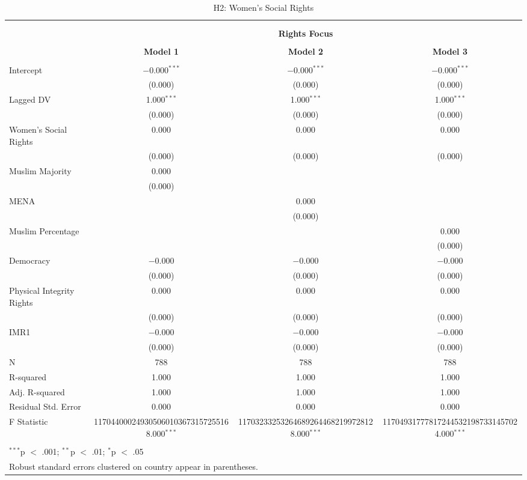 
\begin{table}[!htbp] \centering 
  \caption{H2: Women's Social Rights} 
  \label{} 
\begin{tabular}{@{\extracolsep{5pt}}lccc} 
\\[-1.8ex]\hline \\[-1.8ex] 
\\[-1.8ex] & \multicolumn{3}{c}{\textbf{Rights Focus}} \\ 
\\[-1.8ex] & \textbf{Model 1} & \textbf{Model 2} & \textbf{Model 3}\\ 
\hline \\[-1.8ex] 
 Intercept & $-$0.000$^{***}$ & $-$0.000$^{***}$ & $-$0.000$^{***}$ \\ 
  & (0.000) & (0.000) & (0.000) \\ 
  Lagged DV & 1.000$^{***}$ & 1.000$^{***}$ & 1.000$^{***}$ \\ 
  & (0.000) & (0.000) & (0.000) \\ 
  Women's Social Rights & 0.000 & 0.000 & 0.000 \\ 
  & (0.000) & (0.000) & (0.000) \\ 
  Muslim Majority & 0.000 &  &  \\ 
  & (0.000) &  &  \\ 
  MENA &  & 0.000 &  \\ 
  &  & (0.000) &  \\ 
  Muslim Percentage &  &  & 0.000 \\ 
  &  &  & (0.000) \\ 
  Democracy & $-$0.000 & $-$0.000 & $-$0.000 \\ 
  & (0.000) & (0.000) & (0.000) \\ 
  Physical Integrity Rights & 0.000 & 0.000 & 0.000 \\ 
  & (0.000) & (0.000) & (0.000) \\ 
  IMR1 & $-$0.000 & $-$0.000 & $-$0.000 \\ 
  & (0.000) & (0.000) & (0.000) \\ 
 N & 788 & 788 & 788 \\ 
R-squared & 1.000 & 1.000 & 1.000 \\ 
Adj. R-squared & 1.000 & 1.000 & 1.000 \\ 
Residual Std. Error & 0.000 & 0.000 & 0.000 \\ 
F Statistic & 117044000249305060103673157255168.000$^{***}$ & 117032332532646892644682199728128.000$^{***}$ & 117049317778172445321987331457024.000$^{***}$ \\ 
\hline \\[-1.8ex] 
\multicolumn{4}{l}{$^{***}$p $<$ .001; $^{**}$p $<$ .01; $^{*}$p $<$ .05} \\ 
\multicolumn{4}{l}{Robust standard errors clustered on country appear in parentheses.} \\ 
\end{tabular} 
\end{table} 
